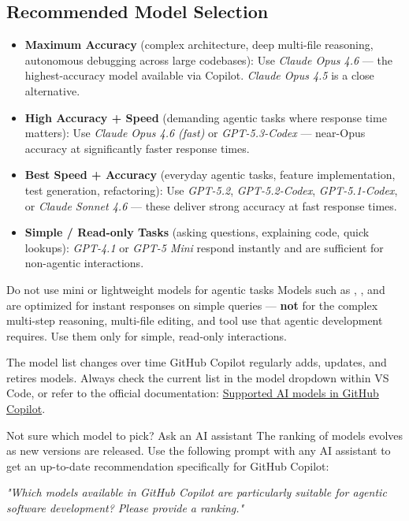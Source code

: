 \subsection{Recommended Model Selection}

\begin{itemize}
   \item \textbf{Maximum Accuracy} (complex architecture, deep multi-file
      reasoning, autonomous debugging across large codebases):
      Use \textit{Claude Opus 4.6} — the highest-accuracy model available
      via Copilot. \textit{Claude Opus 4.5}
      is a close alternative.
   \item \textbf{High Accuracy + Speed} (demanding agentic tasks where response
      time matters):
      Use \textit{Claude Opus 4.6 (fast)} or \textit{GPT-5.3-Codex} —
      near-Opus accuracy at significantly faster response times.
   \item \textbf{Best Speed + Accuracy} (everyday agentic tasks, feature
      implementation, test generation, refactoring):
      Use \textit{GPT-5.2}, \textit{GPT-5.2-Codex}, \textit{GPT-5.1-Codex},
      or \textit{Claude Sonnet 4.6} — these deliver strong accuracy
      at fast response times.
   \item \textbf{Simple / Read-only Tasks} (asking questions, explaining code,
      quick lookups): \textit{GPT-4.1} or \textit{GPT-5 Mini} respond
      instantly and are sufficient for non-agentic interactions.
\end{itemize}

\begin{boxwarning}{Do not use mini or lightweight models for agentic tasks}
Models such as , , and
 are optimized for instant responses on simple
queries — \textbf{not} for the complex multi-step reasoning, multi-file
editing, and tool use that agentic development requires.
Use them only for simple, read-only interactions.
\end{boxwarning}

\begin{boxhint}{The model list changes over time}
GitHub Copilot regularly adds, updates, and retires models.
Always check the current list in the model dropdown within VS Code,
or refer to the official documentation:
\href{https://docs.github.com/en/copilot/using-github-copilot/ai-models/supported-ai-models-in-copilot}
{Supported AI models in GitHub Copilot}.
\end{boxhint}

\begin{boxhint}{Not sure which model to pick? Ask an AI assistant}
The ranking of models evolves as new versions are released.
Use the following prompt with any AI assistant to get an up-to-date
recommendation specifically for GitHub Copilot:

\medskip
\textit{"Which models available in GitHub Copilot are particularly suitable
for agentic software development? Please provide a ranking."}
\end{boxhint}
